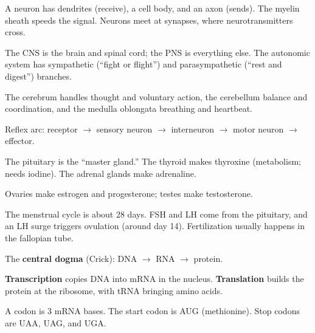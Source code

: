 \begin{gradebody}
\kf
\begin{keyfacts}
\item A neuron has dendrites (receive), a cell body, and an axon (sends). The myelin sheath speeds the signal. Neurons meet at synapses, where neurotransmitters cross.
\item The CNS is the brain and spinal cord; the PNS is everything else. The autonomic system has sympathetic (``fight or flight'') and parasympathetic (``rest and digest'') branches.
\item The cerebrum handles thought and voluntary action, the cerebellum balance and coordination, and the medulla oblongata breathing and heartbeat.
\item Reflex arc: receptor $\rightarrow$ sensory neuron $\rightarrow$ interneuron $\rightarrow$ motor neuron $\rightarrow$ effector.
\end{keyfacts}
\cards
{}

\kf
\begin{keyfacts}
\item The pituitary is the ``master gland.'' The thyroid makes thyroxine (metabolism; needs iodine). The adrenal glands make adrenaline.
\item Ovaries make estrogen and progesterone; testes make testosterone.
\item The menstrual cycle is about 28 days. FSH and LH come from the pituitary, and an LH surge triggers ovulation (around day 14). Fertilization usually happens in the fallopian tube.
\end{keyfacts}
\cards
{}

\kf
\begin{keyfacts}
\item The \textbf{central dogma} (Crick): DNA $\rightarrow$ RNA $\rightarrow$ protein.
\item \textbf{Transcription} copies DNA into mRNA in the nucleus. \textbf{Translation} builds the protein at the ribosome, with tRNA bringing amino acids.
\item A codon is 3 mRNA bases. The start codon is AUG (methionine). Stop codons are UAA, UAG, and UGA.
\end{keyfacts}
\cards
{}


\end{gradebody}

